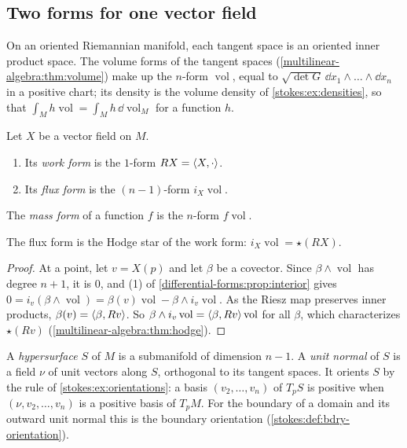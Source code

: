 \begin{notechapter}
\section{Two forms for one vector field}\label{vector-calculus:sec:forms}

On an oriented Riemannian manifold, each tangent space is an oriented
inner product space. The volume forms of the tangent spaces
(\cref{multilinear-algebra:thm:volume}) make up the $n$-form
$\operatorname{vol}$, equal to
$\sqrt{\det G}\,\dd x_1\wedge\dots\wedge\dd x_n$ in a positive chart;
its density is the volume density of \cref{stokes:ex:densities}, so
that $\int_Mh\operatorname{vol} = \int_Mh\,\dd\!\operatorname{vol}_M$
for a function $h$.

\begin{definition}\label{vector-calculus:def:forms}
Let $X$ be a vector field on $M$.
\begin{enumerate}[nosep]
  \item Its \emph{work form} is the $1$-form $RX = \left\langle X, \cdot \right\rangle$.
  \item Its \emph{flux form} is the $(n - 1)$-form
        $i_X\operatorname{vol}$.
\end{enumerate}
The \emph{mass form} of a function $f$ is the $n$-form
$f\operatorname{vol}$.
\end{definition}

\begin{proposition}\label{vector-calculus:prop:star}
The flux form is the Hodge star of the work form:
$i_X\operatorname{vol} = \star(RX)$.
\end{proposition}

\begin{proof}
At a point, let $v = X(p)$ and let $\beta$ be a covector. Since
$\beta\wedge\operatorname{vol}$ has degree $n + 1$, it is $0$, and (1)
of \cref{differential-forms:prop:interior} gives
$0 = i_v(\beta\wedge\operatorname{vol})
= \beta(v)\operatorname{vol} - \beta\wedge i_v\operatorname{vol}$. As
the Riesz map preserves inner products,
$\beta(v) = \left\langle \beta, Rv \right\rangle$. So
$\beta\wedge i_v\operatorname{vol} = \left\langle \beta, Rv \right\rangle\operatorname{vol}$
for all $\beta$, which characterizes $\star(Rv)$
(\cref{multilinear-algebra:thm:hodge}).
\end{proof}

A \emph{hypersurface} $S$ of $M$ is a submanifold of dimension
$n - 1$. A \emph{unit normal} of $S$ is a field $\nu$ of unit vectors
along $S$, orthogonal to its tangent spaces. It orients $S$ by the rule
of \cref{stokes:ex:orientations}: a basis $(v_2,\dots,v_n)$ of $T_pS$
is positive when $(\nu, v_2,\dots,v_n)$ is a positive basis of $T_pM$.
For the boundary of a domain and its outward unit normal this is the
boundary orientation (\cref{stokes:def:bdry-orientation}).


\end{notechapter}
